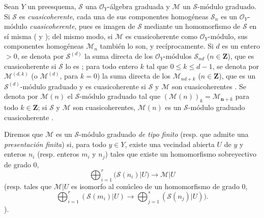 \documentclass[oneside,10pt]{amsart}
\renewcommand{\leq}{\leqslant}
\let\EGAOriginalLabel\label
\renewcommand{\label}[1]{\phantomsection\EGAOriginalLabel{#1}}
\begin{document}
\begin{env}[3.1.1]
\label{II.3.1.1-fr}
Sean $Y$ un preesquema, $\mathcal{S}$ una $\mathcal{O}_Y$-álgebra graduada y $\mathcal{M}$ un $\mathcal{S}$-módulo graduado.
Si $\mathcal{S}$ es \emph{cuasicoherente}, cada una de sus componentes homogéneas $\mathcal{S}_n$ es un $\mathcal{O}_Y$-módulo \emph{cuasicoherente}, pues es imagen de $\mathcal{S}$ mediante un homomorfismo de $\mathcal{S}$ en sí misma ( y ); del mismo modo, si $\mathcal{M}$ es cuasicoherente como $\mathcal{O}_Y$-módulo, sus componentes homogéneas $\mathcal{M}_n$ también lo son, y recíprocamente.
Si $d$ es un entero $>0$, se denota por $\mathcal{S}^{(d)}$ la suma directa de los $\mathcal{O}_Y$-módulos $\mathcal{S}_{nd}$ ($n\in\mathbf{Z}$), que es cuasicoherente si $\mathcal{S}$ lo es ; para todo entero $k$ tal que $0\leq k\leq d-1$, se denota por $\mathcal{M}^{(d,k)}$ (o $\mathcal{M}^{(d)}$, para $k=0$) la suma directa de los $\mathcal{M}_{nd+k}$ ($n\in\mathbf{Z}$), que es un $\mathcal{S}^{(d)}$-módulo graduado y es cuasicoherente si $\mathcal{S}$ y $\mathcal{M}$ son cuasicoherentes .
Se denota por $\mathcal{M}(n)$ el $\mathcal{S}$-módulo graduado tal que $(\mathcal{M}(n))_k=\mathcal{M}_{\boldsymbol{n}+k}$ para todo $k\in\mathbf{Z}$; si $\mathcal{S}$ y $\mathcal{M}$ son cuasicoherentes, $\mathcal{M}(n)$ es un $\mathcal{S}$-módulo graduado cuasicoherente .

Diremos que $\mathcal{M}$ es un $\mathcal{S}$-módulo graduado \emph{de tipo finito} (resp. que admite una \emph{presentación finita}) si, para todo $y\in Y$, existe una vecindad abierta $U$ de $y$ y enteros $n_i$ (resp. enteros $m_i$ y $n_j$) tales que existe un homomorfismo sobreyectivo de grado $0$, \[
  \bigoplus_{i=1}^r(\mathcal{S}(n_i)|U)\longrightarrow\mathcal{M}|U
\] (resp. tales que $\mathcal{M}|U$ es isomorfo al conúcleo de un homomorfismo de grado $0$, \[
  \bigoplus_{i=1}^r(\mathcal{S}(m_i)|U)
  \longrightarrow\bigoplus_{j=1}^s(\mathcal{S}(n_j)|U)).
\]).


\end{env}
\end{document}
